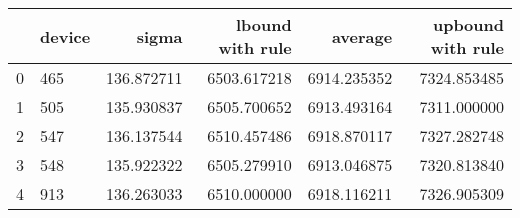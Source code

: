 \begin{tabular}{llrrrr}
\toprule
{} & device &       sigma &  lbound with rule &      average &  upbound with rule \\
\midrule
0 &    465 &  136.872711 &       6503.617218 &  6914.235352 &        7324.853485 \\
1 &    505 &  135.930837 &       6505.700652 &  6913.493164 &        7311.000000 \\
2 &    547 &  136.137544 &       6510.457486 &  6918.870117 &        7327.282748 \\
3 &    548 &  135.922322 &       6505.279910 &  6913.046875 &        7320.813840 \\
4 &    913 &  136.263033 &       6510.000000 &  6918.116211 &        7326.905309 \\
\bottomrule
\end{tabular}
